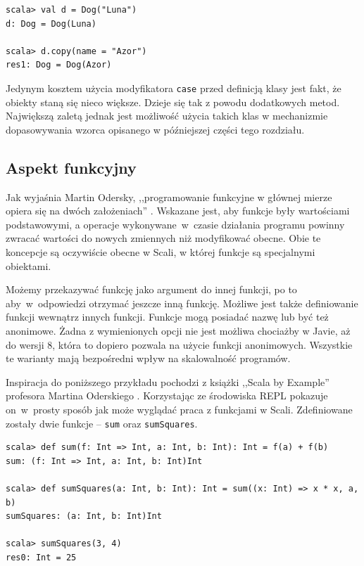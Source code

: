 \documentclass[wimgr]{xmgr}
\begin{document}
\begin{verbatim}
scala> val d = Dog("Luna")
d: Dog = Dog(Luna)

scala> d.copy(name = "Azor")
res1: Dog = Dog(Azor)
\end{verbatim}

Jedynym kosztem użycia modyfikatora \texttt{case} przed definicją klasy jest fakt, że obiekty staną się nieco większe. Dzieje się tak z powodu dodatkowych metod. Największą zaletą jednak jest możliwość użycia takich klas w mechanizmie dopasowywania wzorca opisanego w późniejszej części tego rozdziału.

\subsection{Aspekt funkcyjny}

Jak wyjaśnia Martin Odersky, ,,programowanie funkcyjne w głównej mierze opiera się na dwóch założeniach'' \cite[s.57]{Odersky:2010:PIS}. Wskazane jest, aby funkcje były wartościami podstawowymi, a operacje wykonywane~w~czasie działania programu powinny zwracać wartości do nowych zmiennych niż modyfikować obecne. Obie te koncepcje są oczywiście obecne w Scali, w której funkcje są specjalnymi obiektami. 

Możemy przekazywać funkcję jako argument do innej funkcji, po to aby~w~odpowiedzi otrzymać jeszcze inną funkcję. Możliwe jest także definiowanie funkcji wewnątrz innych funkcji. Funkcje mogą posiadać nazwę lub być też anonimowe. Żadna z wymienionych opcji nie jest możliwa chociażby w Javie, aż do wersji 8, która to dopiero pozwala na użycie funkcji anonimowych. Wszystkie te warianty mają bezpośredni wpływ na skalowalność programów.

Inspiracja do poniższego przykładu pochodzi z książki ,,Scala by Example'' profesora Martina Oderskiego \cite[s. 22]{Odersky:2014:SBE}. Korzystając ze środowiska REPL pokazuje on~w~prosty sposób jak może wyglądać praca z funkcjami w Scali. Zdefiniowane zostały dwie funkcje -- \texttt{sum} oraz \texttt{sumSquares}.

\begin{verbatim}
scala> def sum(f: Int => Int, a: Int, b: Int): Int = f(a) + f(b)
sum: (f: Int => Int, a: Int, b: Int)Int

scala> def sumSquares(a: Int, b: Int): Int = sum((x: Int) => x * x, a, b)
sumSquares: (a: Int, b: Int)Int

scala> sumSquares(3, 4)
res0: Int = 25
\end{verbatim}
\end{document}
